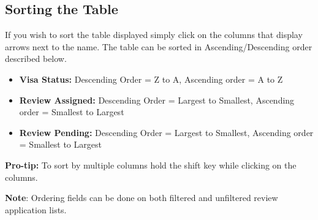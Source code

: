 \documentclass[fontsize=12pt,paper=letter,twoside]{scrartcl}
\begin{document}
\subsection{Sorting the Table}
If you wish to sort the table displayed simply click on the columns that display arrows next to the name. The table can be sorted in Ascending/Descending order described below.
\begin{itemize}
\item \textbf{Visa Status:} Descending Order = Z to A, Ascending order = A to Z
\item \textbf{Review Assigned:} Descending Order = Largest to Smallest, Ascending order = Smallest to Largest
\item \textbf{Review Pending:} Descending Order = Largest to Smallest, Ascending order = Smallest to Largest
\end{itemize}
\textbf{Pro-tip:} To sort by multiple columns hold the shift key while clicking on the columns.

\bigskip
\noindent \textbf{Note}: Ordering fields can be done on both filtered and unfiltered review application lists.
\end{document}
